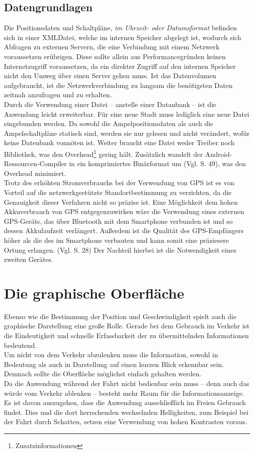 \subsection{Datengrundlagen}
Die Positionsdaten und Schaltpläne, \textit{im Uhrzeit- oder Datumsformat} befinden sich in einer \gls{XML}Datei, welche im internen Speicher abgelegt ist, wodurch sich Abfragen zu externen Servern, die eine Verbindung mit einem Netzwerk voraussetzen erübrigen. Diese sollte allein aus Performancegründen keinen Internetzugriff voraussetzen, da ein direkter Zugriff auf den internen Speicher nicht den Umweg über einen Server gehen muss. Ist das Datenvolumen aufgebraucht, ist die Netzwerkverbindung zu langsam die benötigsten Daten zeitnah anzufragen und zu erhalten.\\
Durch die Verwendung einer Datei -- anstelle einer Datanbank -- ist die Anwendung leicht erweiterbar. Für eine neue Stadt muss lediglich eine neue Datei eingebunden werden. Da sowohl die Ampelpositionsdaten als auch die Ampelschaltpläne statisch sind, werden sie nur gelesen und nicht verändert, wofür keine Datenbank vonnöten ist. Weiter braucht eine Datei weder Treiber noch Bibliothek, was den Overhead\footnote{ Zusatzinformationen} gering hält. Zusätzlich wandelt der Android-Ressourcen-Compiler in ein komprimiertes Binärformat um (Vgl. \cite{androidXML} S. 49), was den Overhead minimiert. \\
Trotz des erhöhten Stromverbrauchs bei der Verwendung von \gls{GPS} ist es von Vorteil auf die netzwerkgestützte Standortbestimmung zu verzichten, da die Genauigkeit dieser Verfahren nicht so präzise ist. 
Eine Möglichkeit dem hohen Akkuverbrauch von \gls{GPS} entgegenzuwirken wäre die Verwendung eines externen \gls{GPS}-Geräts, das über Bluetooth mit dem \gls{Smartphone} verbunden ist und so dessen Akkulaufzeit verlängert. Außerdem ist die Qualität des \gls{GPS}-Empfängers höher als die des im \gls{Smartphone} verbauten und kann somit eine präziesere Ortung erlangen. (Vgl. \cite{gps} S. 28) Der Nachteil hierbei ist die Notwendigkeit eines zweiten Gerätes.
\clearpage
\section{Die graphische Oberfläche}
Ebenso wie die Bestimmung der Position und Geschwindigkeit spielt auch die graphische Darstellung eine große Rolle. Gerade bei dem Gebrauch im Verkehr ist die Eindeutigkeit und schnelle Erfassbarkeit der zu übermittelnden Informationen bedeutend.  \\
Um nicht von dem Verkehr abzulenken muss die Information, sowohl in Bedeutung als auch in Darstellung auf einen kurzen Blick erkennbar sein. Demnach sollte die Oberfläche möglichst einfach gehalten werden.\\
Da die Anwendung während der Fahrt nicht bedienbar sein muss -- denn auch das würde vom Verkehr ablenken -- besteht mehr Raum für die Informationsanzeige. 
Es ist davon auszugehen, dass die Anwendung ausschließlich im Freien Gebrauch findet. Dies und die dort herrschenden wechselnden Helligkeiten, zum Beispiel bei der Fahrt durch Schatten, setzen eine Verwendung von hohen Kontrasten voraus.
